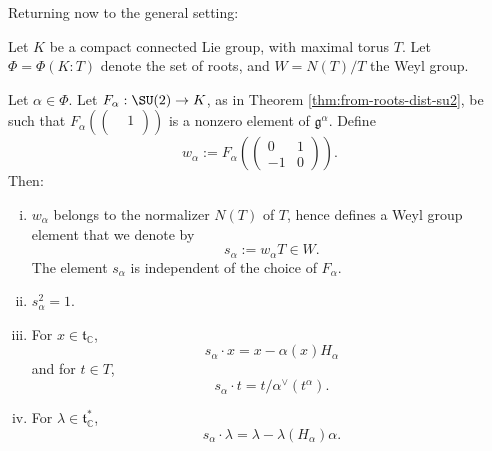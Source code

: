\documentclass[reqno]{amsart} 
\begin{document}
 Returning now to the general setting:
 \begin{theorem}
  Let $K$ be a compact connected Lie group, with maximal torus $T$.  Let $\Phi = \Phi(K:T)$ denote the set of roots, and $W = N(T)/T$ the Weyl group.
  
  Let $\alpha \in \Phi$.  Let $F_\alpha : \SU(2) \rightarrow K$, as in Theorem \ref{thm:from-roots-dist-su2}, be such that $F_\alpha (
\begin{pmatrix}
    & 1 \\
    &
  \end{pmatrix}
)$ is a nonzero element of $\mathfrak{g}^{\alpha}$.  Define
\begin{equation*}
  w_\alpha := F_\alpha (
  \begin{pmatrix}
    0 & 1 \\
    -1 & 0
  \end{pmatrix}
  ).
\end{equation*}
Then:
\begin{enumerate}
[(i)]
  \item $w_\alpha$ belongs to the normalizer $N(T)$ of $T$, hence defines a Weyl group element that we denote by
    \begin{equation*}
      s_\alpha := w_\alpha T \in W.
    \end{equation*}
    The element $s_\alpha$ is independent of the choice of $F_\alpha$.
  \item $s_\alpha^2 = 1$.
  \item For $x \in \mathfrak{t}_{\mathbb{C}}$,
    \begin{equation*}
      s_\alpha \cdot x = x - \alpha(x) H_\alpha
    \end{equation*}
    and for $t \in T$,
    \begin{equation*}
      s_\alpha \cdot t = t / \alpha^\vee(t^\alpha).
    \end{equation*}
  \item For $\lambda \in \mathfrak{t}_{\mathbb{C}}^*$,
    \begin{equation*}
      s_\alpha \cdot \lambda  = \lambda  - \lambda(H_\alpha) \alpha.
    \end{equation*}
  \end{enumerate}
\end{theorem}
\end{document}
